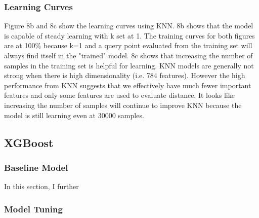 \documentclass{article}
\begin{document}
\subsubsection*{Learning Curves}
Figure 8b and 8c show the learning curves using KNN. 8b shows that the model is capable of steady learning with k set at 1. The training curves for both figures are at 100\% because k=1 and a query point evaluated from the training set will always find itself in the "trained" model. 8c shows that increasing the number of samples in the training set is helpful for learning. KNN models are generally not strong when there is high dimensionality (i.e. 784 features). However the high performance from KNN suggests that we effectively have much fewer important features and only some features are used to evaluate distance. It looks like increasing the number of samples will continue to improve KNN because the model is still learning even at 30000 samples. 

\subsection{XGBoost}
\subsubsection*{Baseline Model}
In this section, I further 
\subsubsection*{Model Tuning}
\end{document}
